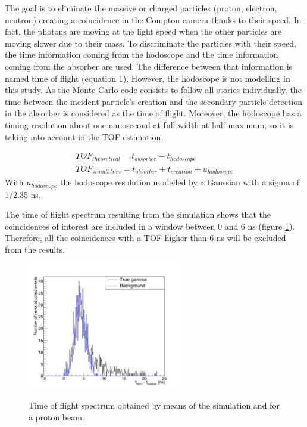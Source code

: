 \documentclass[12pt]{iopart}
\begin{document}
The goal is to eliminate the massive or charged particles (proton, electron, neutron) creating a coincidence in the Compton camera thanks to their speed. In fact, the photons are moving at the light speed when the other particles are moving slower due to their mass. To discriminate the particles with their speed, the time information coming from the hodoscope and the time information coming from the absorber are used. The difference between that information is named time of flight (equation 1). However, the hodoscope is not modelling in this study. As the Monte Carlo code consists to follow all stories individually, the time between the incident particle's creation and the secondary particle detection in the absorber is considered as the time of flight. Moreover, the hodoscope has a timing resolution about one nanosecond at full width at half maximum, so it is taking into account in the TOF estimation.

\begin{eqnarray*}
TOF_{theoretical} = t_{absorber}-t_{hodoscope}\\
TOF_{simulation} = t_{absorber}+t_{creation} + u_{hodoscope}
\end{eqnarray*}
With $u_{hodoscope}$  the hodoscope resolution modelled by a Gaussian with a sigma of 1/2.35 ns. 

The time of flight spectrum resulting from the simulation shows that the coincidences of interest are included in a window between 0 and 6 ns (figure \ref{fig:fig_TOF_distribution_CC_simulation_Hadronth}). Therefore, all the coincidences with a TOF higher than 6 ns will be excluded from the results. 

	\begin{figure} [!hbtp]	
	\centering
	\caption{Time of flight spectrum obtained by means of the simulation and for a proton beam.}	
	\includegraphics[width=0.6\textwidth]{./Figure/Material_Methods/2015_01_04_TOF_spectra_NoCut_1Proton_ResolTemporelle_applied_these.jpg}
	\label{fig:fig_TOF_distribution_CC_simulation_Hadronth}
	\end{figure}
\end{document}
